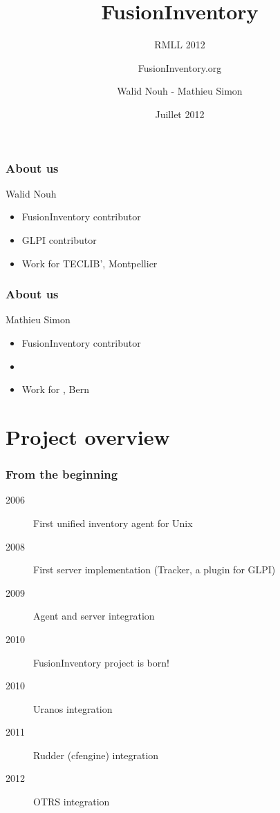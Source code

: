 \documentclass{beamer}
\title{FusionInventory}
\author{{FusionInventory.org}}
\date{Juillet 2012}
\institute{\texttt{[image: ./pics/rmll2011.jpg]}}
\subtitle{RMLL 2012}
\institute{Genêve}
\author{ Walid Nouh - Mathieu Simon}
\begin{document}
\frame[plain]{\titlepage}


\begin{frame}
    \frametitle{About us}


    \begin{block}{Walid Nouh}
        \begin{itemize}
        \item FusionInventory contributor
        \item GLPI contributor  
        \item Work for TECLIB', Montpellier
        \end{itemize}
    \end{block}

\end{frame}

\begin{frame}
    \frametitle{About us}


    \begin{block}{Mathieu Simon}
        \begin{itemize}
        \item FusionInventory contributor
        \item 
        \item Work for , Bern
        \end{itemize}
    \end{block}

\end{frame}

\section{Project overview}

\begin{frame}
    \frametitle{From the beginning}

    \begin{description}
      \item[2006] First unified inventory agent for Unix
      \item[2008] First server implementation (Tracker, a plugin for GLPI)
      \item[2009] Agent and server integration
      \item[2010] FusionInventory project is born! 
      \item[2010] Uranos integration
      \item[2011] Rudder (cfengine) integration
      \item[2012] OTRS integration
    \end{description}

\end{frame}
\end{document}
